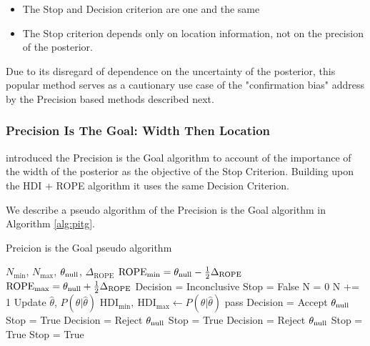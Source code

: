 \begin{itemize}
    \item The Stop and Decision criterion are one and the same
    \item The Stop criterion depends only on location information, not on the precision of the posterior.
\end{itemize}

Due to its disregard of dependence on the uncertainty of the posterior,
this popular method serves as a cautionary use case of the "confirmation bias"
address by the Precision based methods described next.


\subsubsection{Precision Is The Goal: Width Then Location}

\cite{kruschke2015doing} introduced the Precision is the Goal algorithm to account
of the importance of the width of the posterior as the objective of the Stop Criterion.
Building upon the HDI + ROPE algorithm it uses the same Decision Criterion.

We describe a pseudo algorithm of the Precision is the Goal algorithm in Algorithm \ref{alg:pitg}.

\begin{algorithm}
    \caption{Preicion is the Goal pseudo algorithm}\label{alg:pitg}
    \begin{algorithmic}
    \Require $N_\mathrm{min}$, $N_\mathrm{max}$, $\theta_{\rm null}$, $\Delta_\mathrm{ROPE}$
    \State $\mathrm{ROPE}_\mathrm{min} = \theta_{\rm null} - \frac{1}{2}\Delta_\mathrm{ROPE}$
    \State $\mathrm{ROPE}_\mathrm{max} = \theta_{\rm null} + \frac{1}{2}\Delta_\mathrm{ROPE}$
    \State Decision = Inconclusive
    \State Stop = False
    \State N = 0
    \State N += 1  
    \State Update $\hat\theta$, $P(\theta|\hat\theta)$  
    \State $\mathrm{HDI}_\mathrm{min}, \ \mathrm{HDI}_\mathrm{max}  \gets P(\theta|\hat\theta)$
        \State pass  
        \State Decision = Accept $\theta_{\rm null}$ 
        \State Stop = True
        \State Decision = Reject $\theta_{\rm null}$ 
        \State Stop = True
        \State Decision = Reject $\theta_{\rm null}$ 
        \State Stop = True
        \State Stop = True
    \EndIf
    \EndWhile
    \end{algorithmic}
\end{algorithm}

